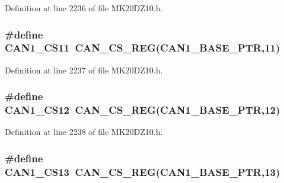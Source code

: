 Definition at line 2236 of file M\+K20\+D\+Z10.\+h.

\subsubsection[{\texorpdfstring{C\+A\+N1\+\_\+\+C\+S11}{CAN1_CS11}}]{\setlength{\rightskip}{0pt plus 5cm}\#define C\+A\+N1\+\_\+\+C\+S11~{\bf C\+A\+N\+\_\+\+C\+S\+\_\+\+R\+EG}({\bf C\+A\+N1\+\_\+\+B\+A\+S\+E\+\_\+\+P\+TR},11)}\hypertarget{group___c_a_n___register___accessor___macros_ga4c5e65c96e80f27f21b5313cac8094fd}{}\label{group___c_a_n___register___accessor___macros_ga4c5e65c96e80f27f21b5313cac8094fd}


Definition at line 2237 of file M\+K20\+D\+Z10.\+h.

\subsubsection[{\texorpdfstring{C\+A\+N1\+\_\+\+C\+S12}{CAN1_CS12}}]{\setlength{\rightskip}{0pt plus 5cm}\#define C\+A\+N1\+\_\+\+C\+S12~{\bf C\+A\+N\+\_\+\+C\+S\+\_\+\+R\+EG}({\bf C\+A\+N1\+\_\+\+B\+A\+S\+E\+\_\+\+P\+TR},12)}\hypertarget{group___c_a_n___register___accessor___macros_ga49c17cc0ef74f679a227fb25ef0251d3}{}\label{group___c_a_n___register___accessor___macros_ga49c17cc0ef74f679a227fb25ef0251d3}


Definition at line 2238 of file M\+K20\+D\+Z10.\+h.

\subsubsection[{\texorpdfstring{C\+A\+N1\+\_\+\+C\+S13}{CAN1_CS13}}]{\setlength{\rightskip}{0pt plus 5cm}\#define C\+A\+N1\+\_\+\+C\+S13~{\bf C\+A\+N\+\_\+\+C\+S\+\_\+\+R\+EG}({\bf C\+A\+N1\+\_\+\+B\+A\+S\+E\+\_\+\+P\+TR},13)}\hypertarget{group___c_a_n___register___accessor___macros_gada4a6eea774433638b7e8b8cb44b63c6}{}\label{group___c_a_n___register___accessor___macros_gada4a6eea774433638b7e8b8cb44b63c6}


